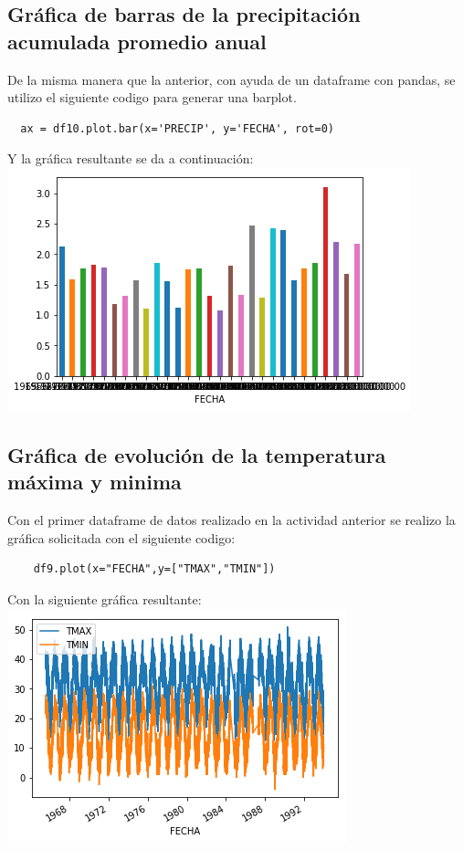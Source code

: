 \documentclass{article}
\begin{document}
 \subsection{Gráfica de barras de la precipitación acumulada promedio anual}
 De la misma manera que la anterior, con ayuda de un dataframe con pandas, se utilizo el siguiente codigo para generar una barplot.
  \begin{verbatim} 
  ax = df10.plot.bar(x='PRECIP', y='FECHA', rot=0)
   \end{verbatim}
Y la gráfica resultante se da a continuación:  \\
 \includegraphics[scale=.85]{barrasprecipanual.png}

\subsection{Gráfica de evolución de la temperatura máxima y minima}
Con el primer dataframe de datos realizado en la actividad anterior se realizo la gráfica solicitada con el siguiente codigo:
\begin{verbatim}
    df9.plot(x="FECHA",y=["TMAX","TMIN"])
\end{verbatim}
Con la siguiente gráfica resultante: \\
\includegraphics[scale=.85]{evoluciondetmaxtmin.png}
\end{document}
